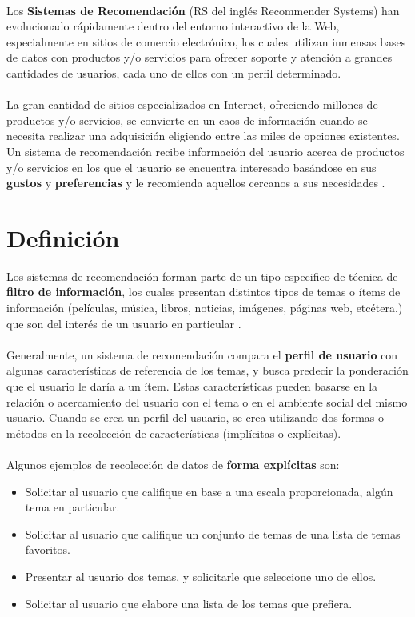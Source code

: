 \documentclass[12pt,letterpaper,oneside] {memoir}
\begin{document}
\paragraph{} 
Los \textbf{Sistemas de Recomendación} (RS del inglés Recommender Systems) han evolucionado rápidamente dentro del entorno interactivo de la Web, especialmente en sitios de comercio electrónico, los cuales utilizan inmensas bases de datos con productos y/o servicios para ofrecer soporte y atención a grandes cantidades de usuarios, cada uno de ellos con un perfil determinado.
\paragraph{}
La gran cantidad de sitios especializados en Internet, ofreciendo millones de productos y/o servicios, se convierte en un caos de información cuando se necesita realizar una adquisición eligiendo entre las miles de opciones existentes. Un sistema de recomendación recibe información del usuario acerca de productos y/o servicios en los que el usuario se encuentra interesado basándose en sus \textbf{gustos} y \textbf{preferencias} y le recomienda aquellos cercanos a sus necesidades \citep{GarciaGil2007}. 

\section{Definición}
Los sistemas de recomendación forman parte de un tipo especifico de técnica de \textbf{filtro de información}, los cuales presentan distintos tipos de temas o ítems de información (películas, música, libros, noticias, imágenes, páginas web, etcétera.) que son del interés de un usuario en particular \citep{wikipedia}. 
\paragraph{}
Generalmente, un sistema de recomendación compara el \textbf{perfil de usuario} con algunas características de referencia de los temas, y busca predecir la ponderación que el usuario le daría a un ítem. Estas características pueden basarse en la relación o acercamiento del usuario con el tema o en el ambiente social del mismo usuario. Cuando se crea un perfil del usuario, se crea utilizando dos formas o métodos en la recolección de características (implícitas o explícitas).
\paragraph{}
Algunos ejemplos de recolección de datos de \textbf{forma explícitas} son:
\begin{itemize}
	\item Solicitar al usuario que califique en base a una escala proporcionada, algún tema en particular.
	\item Solicitar al usuario que califique un conjunto de temas de una lista de temas favoritos.
	\item Presentar al usuario dos temas, y solicitarle que seleccione uno de ellos.
	\item Solicitar al usuario que elabore una lista de los temas que prefiera. 
\end{itemize}
\end{document}
